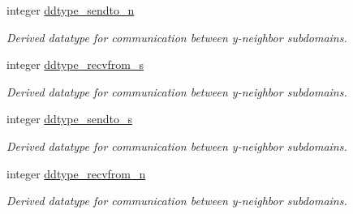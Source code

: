 \textbf{ }\par
\begin{DoxyCompactItemize}
\item 
integer \mbox{\hyperlink{namespacemodule__mpi__subdomain_a662c94173cf13879c5fea89a04fd8ffa}{ddtype\+\_\+sendto\+\_\+n}}
\begin{DoxyCompactList}\small\item\em Derived datatype for communication between y-\/neighbor subdomains. \end{DoxyCompactList}\item 
integer \mbox{\hyperlink{namespacemodule__mpi__subdomain_ada96687f5bacdbe6f66c542c7b9ec37b}{ddtype\+\_\+recvfrom\+\_\+s}}
\begin{DoxyCompactList}\small\item\em Derived datatype for communication between y-\/neighbor subdomains. \end{DoxyCompactList}\item 
integer \mbox{\hyperlink{namespacemodule__mpi__subdomain_a8d1c7ef37ac2dca93a693c070d77638b}{ddtype\+\_\+sendto\+\_\+s}}
\begin{DoxyCompactList}\small\item\em Derived datatype for communication between y-\/neighbor subdomains. \end{DoxyCompactList}\item 
integer \mbox{\hyperlink{namespacemodule__mpi__subdomain_a200baef48d70fe5075d62807732c8db4}{ddtype\+\_\+recvfrom\+\_\+n}}
\begin{DoxyCompactList}\small\item\em Derived datatype for communication between y-\/neighbor subdomains. \end{DoxyCompactList}\end{DoxyCompactItemize}

